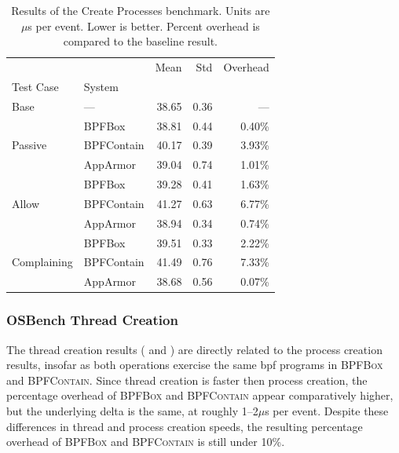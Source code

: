 \documentclass[
  fontsize=12pt,
  titlepage=firstiscover,
  paper=letter,
oneside,
  cleardoublepage=plain,
  parskip=half-,
  DIV=10,
  parindent,
  appendixprefix,
  chapterprefix,
  listof=totoc,
]{scrbook}
\newcommand{\bpfbox}{\textsc{BPFBox}}
\newcommand{\bpfcontain}{\textsc{BPFContain}}
\begin{document}
\begin{table}[ht!]
\centering
\footnotesize
\caption[Results of the Create Processes benchmark]{Results of the Create Processes benchmark. Units are $\mu$s per event. Lower is better. Percent overhead is compared to the baseline result.}
\label{tab:phoronix-create-processes}
\begin{tabular}{llrrr}
\toprule
            &          &   Mean &   Std & Overhead \\
Test Case & System &        &       &          \\
\midrule
Base & --- &  38.65 &  0.36 &      --- \\
\cline{1-5}
\multirow{3}{*}{Passive} & BPFBox &  38.81 &  0.44 &   0.40\% \\
            & BPFContain &  40.17 &  0.39 &   3.93\% \\
            & AppArmor &  39.04 &  0.74 &   1.01\% \\
\cline{1-5}
\multirow{3}{*}{Allow} & BPFBox &  39.28 &  0.41 &   1.63\% \\
            & BPFContain &  41.27 &  0.63 &   6.77\% \\
            & AppArmor &  38.94 &  0.34 &   0.74\% \\
\cline{1-5}
\multirow{3}{*}{Complaining} & BPFBox &  39.51 &  0.33 &   2.22\% \\
            & BPFContain &  41.49 &  0.76 &   7.33\% \\
            & AppArmor &  38.68 &  0.56 &   0.07\% \\
\bottomrule
\end{tabular}
\end{table}

\FloatBarrier



\subsubsection{OSBench Thread Creation}

The thread creation results ( and )
are directly related to the process creation results, insofar as both operations exercise
the same \gls{bpf} programs in \bpfbox{} and \bpfcontain{}. Since thread creation is
faster then process creation, the percentage overhead of \bpfbox{} and \bpfcontain{}
appear comparatively higher, but the underlying delta is the same, at roughly 1--2$\mu$s
per event. Despite these differences in thread and process creation speeds, the resulting
percentage overhead of \bpfbox{} and \bpfcontain{} is still under 10\%.
\end{document}
